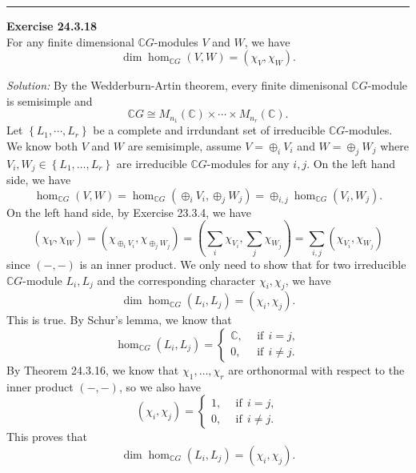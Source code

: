 \documentclass[a4paper, 12pt]{article}
\newenvironment{problem}[2][Exercise]
    { \begin{mdframed}[backgroundcolor=gray!20] \textbf{#1 #2} \\}
    {  \end{mdframed}}
\newenvironment{solution}
    {\textit{Solution:}}
    {}
\newcommand{\iif}{\ \ \text{if}\ \ }
\begin{document}
\noindent\rule{7in}{2.8pt}
\begin{problem}{24.3.18}
For any finite dimensional \(\mathbb{C}G\)-modules \(V\) and \(W\), we have 
\[\dim \hom_{\mathbb{C}G}(V,W)=(\chi_V,\chi_W).\]
\end{problem}
\begin{solution}
By the Wedderburn-Artin theorem, every finite dimenisonal \(\mathbb{C}G\)-module is semisimple and 
\[\mathbb{C}G\cong M_{n_1}(\mathbb{C})\times \cdots\times M_{n_r}(\mathbb{C}).\]
Let \(\left\{ L_1,\cdots,L_r \right\}\) be a complete and irrdundant set of irreducible \(\mathbb{C}G\)-modules. We know both \(V\) and \(W\) are semisimple, assume 
\(V=\oplus_i V_i\) and \(W=\oplus_j W_j\) where \(V_i,W_j\in \left\{ L_1,\ldots,L_r \right\}\) are irreducible \(\mathbb{C}G\)-modules for any \(i,j\). On the left hand side, we have 
\[\hom_{\mathbb{C}G}(V,W)=\hom_{\mathbb{C}G}(\oplus_i V_i,\oplus_j W_j)=\oplus_{i,j}\hom_{\mathbb{C}G}(V_i,W_j).\]
On the left hand side, by Exercise 23.3.4, we have 
\[(\chi_V,\chi_W)=(\chi_{\oplus_i V_i},\chi_{\oplus_j W_j})=(\sum_i \chi_{V_i},\sum_j \chi_{W_j})=\sum_{i,j}(\chi_{V_i},\chi_{W_j})\]
since \((-,-)\) is an inner product. We only need to show that for two irreducible \(\mathbb{C}G\)-module \(L_i,L_j\) and the corresponding character \(\chi_i,\chi_j\), we have 
\[\dim \hom_{\mathbb{C}G}(L_i,L_j)=(\chi_i,\chi_j).\]
This is true. By Schur's lemma, we know that 
\[\hom_{\mathbb{C}G}(L_i,L_j)=\begin{cases}
	\mathbb{C},&\iif i=j,\\ 
	0,&\iif i\neq j.
\end{cases}\] 
By Theorem 24.3.16, we know that \(\chi_1,\ldots,\chi_r\) are orthonormal with respect to the inner product \((-,-)\), so we also have 
\[(\chi_i,\chi_j)=\begin{cases}
	1,&\iif i=j,\\ 
	0,&\iif i\neq j.
\end{cases}\]
This proves that 
\[\dim \hom_{\mathbb{C}G}(L_i,L_j)=(\chi_i,\chi_j).\]
\end{solution}
\end{document}
